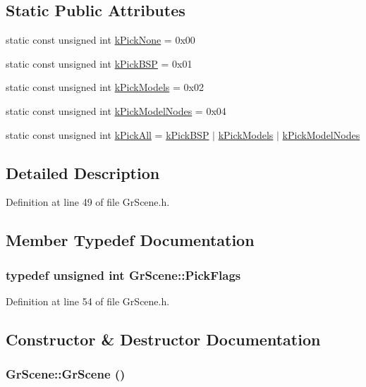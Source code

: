 \subsection*{Static Public Attributes}
\begin{CompactItemize}
\item 
static const unsigned int \hyperlink{class_gr_scene_d8f34543a299f163c881ba927ca00ced}{kPickNone} = 0x00
\item 
static const unsigned int \hyperlink{class_gr_scene_a2d4949176b03e4de401133af3c7539c}{kPickBSP} = 0x01
\item 
static const unsigned int \hyperlink{class_gr_scene_812919af44c1508b2e91ef02618a3794}{kPickModels} = 0x02
\item 
static const unsigned int \hyperlink{class_gr_scene_f34d527cd99bc6bb9029a87a57de4b96}{kPickModelNodes} = 0x04
\item 
static const unsigned int \hyperlink{class_gr_scene_a8cf807b21fc873fd6158af7ca6da3e5}{kPickAll} = \hyperlink{class_gr_scene_a2d4949176b03e4de401133af3c7539c}{kPickBSP} $|$ \hyperlink{class_gr_scene_812919af44c1508b2e91ef02618a3794}{kPickModels} $|$ \hyperlink{class_gr_scene_f34d527cd99bc6bb9029a87a57de4b96}{kPickModelNodes}
\end{CompactItemize}


\subsection{Detailed Description}


Definition at line 49 of file GrScene.h.

\subsection{Member Typedef Documentation}
\hypertarget{class_gr_scene_7645ba831bfac8f4543f59ff7b2c63bd}{
\subsubsection[{PickFlags}]{\setlength{\rightskip}{0pt plus 5cm}typedef unsigned int {\bf GrScene::PickFlags}}}
\label{class_gr_scene_7645ba831bfac8f4543f59ff7b2c63bd}




Definition at line 54 of file GrScene.h.

\subsection{Constructor \& Destructor Documentation}
\hypertarget{class_gr_scene_e34b9d499e43774f936ead2aaa262538}{
\subsubsection[{GrScene}]{\setlength{\rightskip}{0pt plus 5cm}GrScene::GrScene ()}}
\label{class_gr_scene_e34b9d499e43774f936ead2aaa262538}




